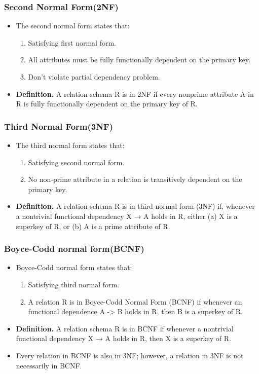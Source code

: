 \documentclass[12pt,a4paper]{article}
\begin{document}
 \subsubsection{Second Normal Form(2NF)}
 \begin{itemize}
    \item The second normal form states that:
        \begin{enumerate}
            \item Satisfying first normal form.
            \item All attributes must be fully functionally dependent on the primary key.
            \item Don't violate partial dependency problem.
        \end{enumerate}
    \item \textbf{Definition.} A relation schema R is in 2NF if every nonprime attribute A in R is fully functionally dependent on the primary key of R.
 \end{itemize}
 
 \subsubsection{Third Normal Form(3NF)}
 \begin{itemize}
    \item The third normal form states that:
        \begin{enumerate}
            \item Satisfying second normal form.
            \item No non-prime attribute in a relation is transitively dependent on the primary key.
        \end{enumerate}
    \item \textbf{Definition.} A relation schema R is in third normal form (3NF) if, whenever a nontrivial functional dependency X → A holds in R, either (a) X is a superkey of R, or (b) A is a prime attribute of R.
 \end{itemize}
 
 \subsubsection{Boyce-Codd normal form(BCNF)}
 \begin{itemize}
    \item Boyce-Codd normal form states that:
        \begin{enumerate}
            \item Satisfying third normal form.
            \item A relation R is in Boyce-Codd Normal Form (BCNF) if whenever an functional dependence A -> B holds in R, then B is a superkey of R.
        \end{enumerate}
    \item \textbf{Definition.} A relation schema R is in BCNF if whenever a nontrivial functional dependency X → A holds in R, then X is a superkey of R.
    \item Every relation in BCNF is also in 3NF; however, a relation in 3NF is not necessarily in BCNF.
 \end{itemize}
 
\end{document}
